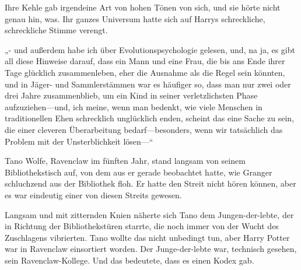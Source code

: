 Ihre Kehle gab irgendeine Art von hohen Tönen von sich, und sie hörte nicht genau hin, was. Ihr ganzes Universum hatte sich auf Harrys schreckliche, schreckliche Stimme verengt.

„- und außerdem habe ich über Evolutionspsychologie gelesen, und, na ja, es gibt all diese Hinweise darauf, dass ein Mann und eine Frau, die bis ans Ende ihrer Tage glücklich zusammenleben, eher die Ausnahme als die Regel sein könnten, und in Jäger- und Sammlerstämmen war es häufiger so, dass man nur zwei oder drei Jahre zusammenblieb, um ein Kind in seiner verletzlichsten Phase aufzuziehen—und, ich meine, wenn man bedenkt, wie viele Menschen in traditionellen Ehen schrecklich unglücklich enden, scheint das eine Sache zu sein, die einer cleveren Überarbeitung bedarf—besonders, wenn wir tatsächlich das Problem mit der Unsterblichkeit lösen—“

\later

Tano Wolfe, Ravenclaw im fünften Jahr, stand langsam von seinem Bibliothekstisch auf, von dem aus er gerade beobachtet hatte, wie Granger schluchzend aus der Bibliothek floh. Er hatte den Streit nicht hören können, aber es war eindeutig einer von diesen Streits gewesen.


Langsam und mit zitternden Knien näherte sich Tano dem Jungen-der-lebte, der in Richtung der Bibliothekstüren starrte, die noch immer von der Wucht des Zuschlagens vibrierten. Tano wollte das nicht unbedingt tun, aber Harry Potter war in Ravenclaw einsortiert worden. Der Junge-der-lebte war, technisch gesehen, sein Ravenclaw-Kollege. Und das bedeutete, dass es einen Kodex gab.

